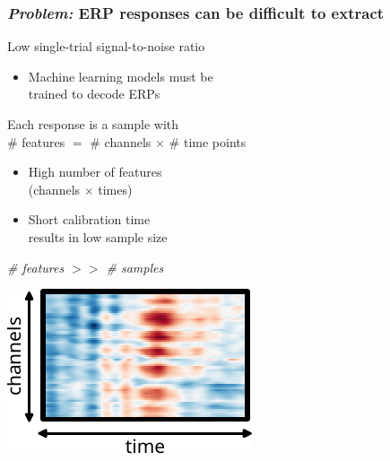 \documentclass{kul-ulille-beamer}
\begin{document}
\begin{frame}[c]
  \frametitle{\emph{Problem:} ERP responses can be difficult to extract}
  \begin{minipage}[c]{.5\textwidth}

    Low single-trial signal-to-noise ratio
    \begin{itemize}
      \item Machine learning models must be \\ trained to decode ERPs
    \end{itemize}
    \bigskip

    Each response is a sample with \\
    \# features $=$ \# channels $\times$ \# time points
    \begin{itemize}
      \item High number of features \\ (channels $\times$ times)
      \item Short calibration time \\ results in low sample size
    \end{itemize}
    \bigskip

    \centering
    \emph{\# features $>>$ \# samples}

  \end{minipage}\hfill%
  \begin{minipage}[c]{.4\textwidth}
    \raggedleft

    \includegraphics[width=\textwidth]{figures/bttda/tensor_st.pdf}

  \end{minipage}
\end{frame}
\end{document}
